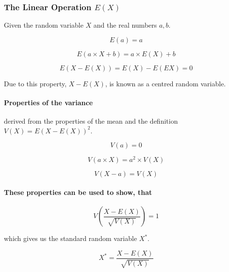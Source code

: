 \documentclass[a4paper, 10pt]{article}
\begin{document}
	\subsubsection{The Linear Operation \(E(X)\)}

	Given the random variable \(X\) and the real numbers \(a, b\).

	\begin{equation*}
		E(a)=a
	\end{equation*}

	\begin{equation*}
		E(a\times X + b) = a\times E(X) + b
	\end{equation*}

	\begin{equation*}
		E(X-E(X)) = E(X) - E(EX) = 0
	\end{equation*}

	\noindent Due to this property, \(X-E(X)\), is known as a centred random variable.

	\paragraph{Properties of the variance}

	derived from the properties of the mean and the definition \(V(X) = E(X-E(X))^2\).

	\begin{equation*}
		V(a)=0
	\end{equation*}

	\begin{equation*}
		V(a\times X)=a^2\times V(X)
	\end{equation*}

	\begin{equation*}
		V(X-a)=V(X)
	\end{equation*}

	\paragraph{These properties can be used to show, that}

	\begin{equation*}
		V\left( \frac{X-E(X)}{\sqrt{V(X)}}\right) =1
	\end{equation*}

	\noindent which gives us the standard random variable \(X^*\).

	\begin{equation*}
		X^*= \frac{X-E(X)}{\sqrt{V(X)}}
	\end{equation*}
\end{document}
